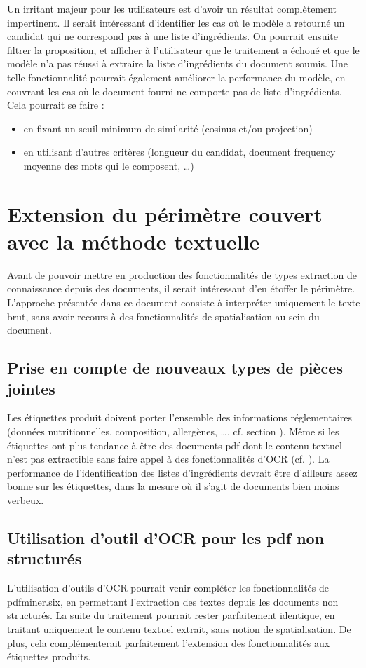     Un irritant majeur pour les utilisateurs est d'avoir un résultat complètement impertinent.
    Il serait intéressant d'identifier les cas où le modèle a retourné un candidat qui ne correspond pas à une liste d'ingrédients.
    On pourrait ensuite filtrer la proposition, et afficher à l'utilisateur que le traitement a échoué et que le modèle n'a pas réussi à extraire la liste d'ingrédients du document soumis.
    Une telle fonctionnalité pourrait également améliorer la performance du modèle, en couvrant les cas où le document fourni ne comporte pas de liste d'ingrédients.
    Cela pourrait se faire :
    \begin{itemize}
        \item en fixant un seuil minimum de similarité (cosinus et/ou projection) 
        \item en utilisant d'autres critères (longueur du candidat, document frequency moyenne des mots qui le composent, \dots)
    \end{itemize}

    \section{Extension du périmètre couvert avec la méthode \og textuelle \fg}

    Avant de pouvoir mettre en production des fonctionnalités de types extraction de connaissance depuis des documents, il serait intéressant d'en étoffer le périmètre.
    L'approche présentée dans ce document consiste à interpréter uniquement le texte brut, sans avoir recours à des fonctionnalités de spatialisation au sein du document.

    \subsection{Prise en compte de nouveaux types de pièces jointes}
    Les étiquettes produit doivent porter l'ensemble des informations réglementaires (données nutritionnelles, composition, allergènes, \dots, cf. section ).
    Même si les étiquettes ont plus tendance à être des documents pdf dont le contenu textuel n'est pas extractible sans faire appel à des fonctionnalités d'OCR (cf. ).
    La performance de l'identification des listes d'ingrédients devrait être d'ailleurs assez bonne sur les étiquettes, dans la mesure où il s'agit de documents bien moins verbeux.

    \subsection{Utilisation d'outil d'OCR pour les pdf non structurés}
    L'utilisation d'outils d'OCR pourrait venir compléter les fonctionnalités de pdfminer.six, en permettant l'extraction des textes depuis les documents non structurés.
    La suite du traitement pourrait rester parfaitement identique, en traitant uniquement le contenu textuel extrait, sans notion de spatialisation.
    De plus, cela complémenterait parfaitement l'extension des fonctionnalités aux étiquettes produits.

